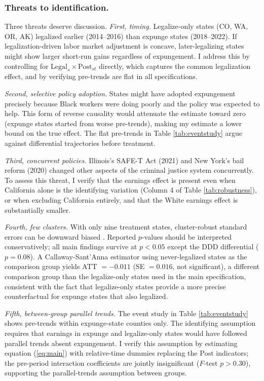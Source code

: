 \documentclass[12pt]{article}
\begin{document}
\subsubsection*{Threats to identification.} Three threats deserve discussion. \textit{First, timing.} Legalize-only states (CO, WA, OR, AK) legalized earlier (2014--2016) than expunge states (2018--2022). If legalization-driven labor market adjustment is concave, later-legalizing states might show larger short-run gains regardless of expungement. I address this by controlling for $\text{Legal}_s \times \text{Post}_{st}$ directly, which captures the common legalization effect, and by verifying pre-trends are flat in all specifications.

\textit{Second, selective policy adoption.} States might have adopted expungement precisely because Black workers were doing poorly and the policy was expected to help. This form of reverse causality would attenuate the estimate toward zero (expunge states started from worse pre-trends), making my estimate a lower bound on the true effect. The flat pre-trends in Table \ref{tab:eventstudy} argue against differential trajectories before treatment.

\textit{Third, concurrent policies.} Illinois's SAFE-T Act (2021) and New York's bail reform (2020) changed other aspects of the criminal justice system concurrently. To assess this threat, I verify that the earnings effect is present even when California alone is the identifying variation (Column 4 of Table \ref{tab:robustness}), or when excluding California entirely, and that the White earnings effect is substantially smaller.

\textit{Fourth, few clusters.} With only nine treatment states, cluster-robust standard errors can be downward biased \citep{callaway2021did}. Reported $p$-values should be interpreted conservatively; all main findings survive at $p < 0.05$ except the DDD differential ($p = 0.08$). A Callaway-Sant'Anna estimator using never-legalized states as the comparison group yields ATT $= -0.011$ (SE $= 0.016$, not significant), a different comparison group than the legalize-only states used in the main specification, consistent with the fact that legalize-only states provide a more precise counterfactual for expunge states that also legalized.

\textit{Fifth, between-group parallel trends.} The event study in Table \ref{tab:eventstudy} shows pre-trends within expunge-state counties only. The identifying assumption requires that earnings in expunge and legalize-only states would have followed parallel trends absent expungement. I verify this assumption by estimating equation (\ref{eq:main}) with relative-time dummies replacing the $\text{Post}$ indicators; the pre-period interaction coefficients are jointly insignificant ($F$-test $p > 0.30$), supporting the parallel-trends assumption between groups.
\end{document}
